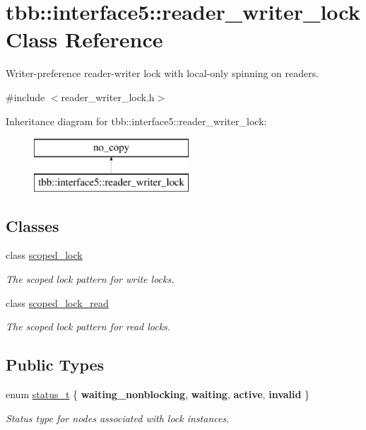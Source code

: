 \hypertarget{classtbb_1_1interface5_1_1reader__writer__lock}{}\section{tbb\+:\+:interface5\+:\+:reader\+\_\+writer\+\_\+lock Class Reference}
\label{classtbb_1_1interface5_1_1reader__writer__lock}


Writer-\/preference reader-\/writer lock with local-\/only spinning on readers.  




{\ttfamily \#include $<$reader\+\_\+writer\+\_\+lock.\+h$>$}

Inheritance diagram for tbb\+:\+:interface5\+:\+:reader\+\_\+writer\+\_\+lock\+:\begin{figure}[H]
\begin{center}
\leavevmode
\includegraphics[height=2.000000cm]{classtbb_1_1interface5_1_1reader__writer__lock}
\end{center}
\end{figure}
\subsection*{Classes}
\begin{DoxyCompactItemize}
\item 
class \hyperlink{classtbb_1_1interface5_1_1reader__writer__lock_1_1scoped__lock}{scoped\+\_\+lock}
\begin{DoxyCompactList}\small\item\em The scoped lock pattern for write locks. \end{DoxyCompactList}\item 
class \hyperlink{classtbb_1_1interface5_1_1reader__writer__lock_1_1scoped__lock__read}{scoped\+\_\+lock\+\_\+read}
\begin{DoxyCompactList}\small\item\em The scoped lock pattern for read locks. \end{DoxyCompactList}\end{DoxyCompactItemize}
\subsection*{Public Types}
\begin{DoxyCompactItemize}
\item 
enum \hyperlink{classtbb_1_1interface5_1_1reader__writer__lock_a29bbf9ca21c12b313d9fa5326feaf3ed}{status\+\_\+t} \{ {\bfseries waiting\+\_\+nonblocking}, 
{\bfseries waiting}, 
{\bfseries active}, 
{\bfseries invalid}
 \}\begin{DoxyCompactList}\small\item\em Status type for nodes associated with lock instances. \end{DoxyCompactList}
\end{DoxyCompactItemize}
